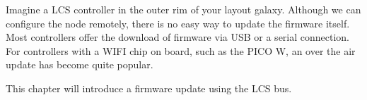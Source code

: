 
Imagine a LCS controller in the outer rim of your layout galaxy. Although we can configure the node remotely, there is no easy way to update the firmware itself. Most controllers offer the download of firmware via USB or a serial connection. For controllers with a WIFI chip on board, such as the PICO W, an over the air update has become quite popular. 

This chapter will introduce a firmware update using the LCS bus. 



